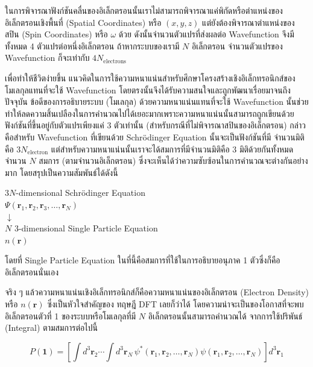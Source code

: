 ในการพิจารณาฟังก์ชันคลื่นของอิเล็กตรอนนั้นเราไม่สามารถพิจารณาแค่พิกัดหรือตำแหน่งของอิเล็กตรอนเชิงพื้นที่ (Spatial Coordinates) หรือ
$(x, y, z)$ แต่ยังต้องพิจารณาตำแหน่งของสปิน (Spin Coordinates) หรือ $\omega$ ด้วย ดังนั้นจำนวนตัวแปรที่ส่งผลต่อ Wavefunction 
จึงมีทั้งหมด 4 ตัวแปรต่อหนึ่งอิเล็กตรอน ถ้าหากระบบของเรามี $N$ อิเล็กตรอน จำนวนตัวแปรของ Wavefunction ก็จะเท่ากับ 
$4 N_{\text{electrons}}$

เพื่อทำให้ชีวิตง่ายขึ้น แนวคิดในการใช้ความหนาแน่นสำหรับศึกษาโครงสร้างเชิงอิเล็กทรอนิกส์ของโมเลกุลแทนที่จะใช้ Wavefunction 
โดยตรงนั้นจึงได้รับความสนใจและถูกพัฒนาเรื่อยมาจนถึงปัจจุบัน ข้อดีของการอธิบายระบบ (โมเลกุล) ด้วยความหนาแน่นแทนที่จะใช้ Wavefunction 
นั้นช่วยทำให้ลดความสิ้นเปลืองในการคำนวณไปได้เยอะมากเพราะความหนาแน่นนั้นสามารถถูกเขียนด้วยฟังก์ชันที่ขึ้นอยู่กับตัวแปรเพียงแค่ 3 ตัวเท่านั้น 
(สำหรับกรณีที่ไม่พิจารณาสปินของอิเล็กตรอน) กล่าวคือสำหรับ Wavefunction ที่เขียนด้วย Schr\"{o}dinger Equation นั้นจะเป็นฟังก์ชันที่มี%
จำนวนมิติคือ $3N_{\text{electron}}$ แต่สำหรับความหนาแน่นนั้นเราจะได้สมการที่มีจำนวนมิติคือ 3 มิติด้วยกันทั้งหมดจำนวน $N$ สมการ 
(ตามจำนวนอิเล็กตรอน) ซึ่งจะเห็นได้ว่าความซับซ้อนในการคำนวณจะต่างกันอย่างมาก โดยสรุปเป็นความสัมพันธ์ได้ดังนี้

\begin{framed}
    \centering
    $3N$-dimensional Schr\"{o}dinger Equation \\
    $\Psi(\bm{r}_{1}, \bm{r}_{2}, \bm{r}_{3}, \dots, \bm{r}_{N})$ \\
    $\downarrow$ \\ 
    $N$ $3$-dimensional Single Particle Equation \\
    $n({\bm{r}})$
\end{framed}

\noindent โดยที่ Single Particle Equation ในที่นี้คือสมการที่ใช้ในการอธิบายอนุภาค 1 ตัวซึ่งก็คืออิเล็กตรอนนั่นเอง

จริง ๆ แล้วความหนาแน่นเชิงอิเล็กทรอนิกส์ก็คือความหนาแน่นของอิเล็กตรอน (Electron Density) หรือ $n(\bm{r})$ ซึ่งเป็นหัวใจสำคัญของ%
ทฤษฎี DFT เลยก็ว่าได้ โดยความน่าจะเป็นของโอกาสที่จะพบอิเล็กตรอนตัวที่ 1 ของระบบหรือโมเลกุลที่มี $N$ อิเล็กตรอนนั้นสามารถคำนวณได้%
จากการใช้ปริพันธ์ (Integral) ตามสมการต่อไปนี้

\begin{equation}\label{eq:elec_prob_density_1e}
    P(\bm{1}) = \left [ \int {d}^{3} \bm{r}_{2} \cdots \int {d}^{3} \bm{r}_{N} \, 
                \psi^*(\bm{r}_{1}, \bm{r}_{2}, \dots, \bm{r}_{N}) \psi(\bm{r}_{1}, \bm{r}_2, 
                \dots, \bm{r}_N) \right ] {d}^{3} \bm{r}_{1}
\end{equation}

